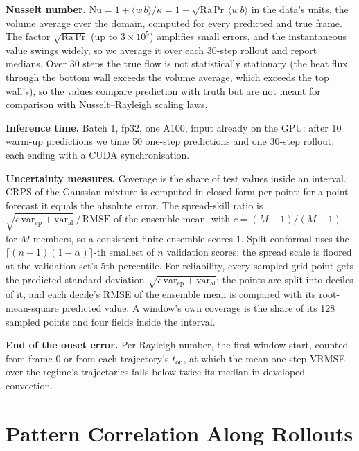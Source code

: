 \documentclass[11pt]{article}
\begin{document}
\textbf{Nusselt number.} $\mathrm{Nu}=1+\langle w\,b\rangle/\kappa = 1+\sqrt{\mathrm{Ra}\,\mathrm{Pr}}\,\langle
w\,b\rangle$ in the data's units, the volume average over the domain, computed for every predicted and true frame. The
factor $\sqrt{\mathrm{Ra}\,\mathrm{Pr}}$ (up to $3\times10^5$) amplifies small errors, and the instantaneous value
swings widely, so we average it over each 30-step rollout and report medians. Over 30 steps the true flow is not
statistically stationary (the heat flux through the bottom wall exceeds the volume average, which exceeds the top
wall's), so the values compare prediction with truth but are not meant for comparison with Nusselt--Rayleigh scaling
laws.

\textbf{Inference time.} Batch 1, fp32, one A100, input already on the GPU: after 10 warm-up predictions we time 50
one-step predictions and one 30-step rollout, each ending with a CUDA synchronisation.

\textbf{Uncertainty measures.} Coverage is the share of test values inside an interval. CRPS of the Gaussian mixture
is computed in closed form per point; for a point forecast it equals the absolute error. The spread-skill ratio is
$\sqrt{\overline{c\,\mathrm{var}_{\mathrm{ep}}+\mathrm{var}_{\mathrm{al}}}}\,/\,\mathrm{RMSE}$ of the ensemble mean,
with $c=(M+1)/(M-1)$ for $M$ members, so a consistent finite ensemble scores 1. Split conformal uses the
$\lceil (n+1)(1-\alpha)\rceil$-th smallest of $n$ validation scores; the spread scale is floored at the validation
set's 5th percentile. For reliability, every sampled grid point gets the predicted standard deviation
$\sqrt{c\,\mathrm{var}_{\mathrm{ep}}+\mathrm{var}_{\mathrm{al}}}$; the points are split into deciles of it, and each
decile's RMSE of the ensemble mean is compared with its root-mean-square predicted value. A window's own coverage is
the share of its 128 sampled points and four fields inside the interval.

\textbf{End of the onset error.} Per Rayleigh number, the first window start, counted from frame 0 or from each
trajectory's $t_{\mathrm{on}}$, at which the mean one-step VRMSE over the regime's trajectories falls below twice its
median in developed convection.

\section{Pattern Correlation Along Rollouts}
\label{app:correlation}
\end{document}
